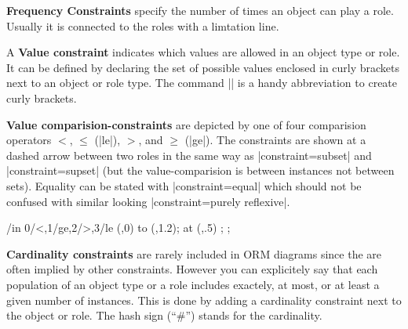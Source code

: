 \documentclass[a4paper,10pt]{article}
\begin{document}
\noindent\textbf{Frequency Constraints} specify the number of times an object can play a role. Usually it is connected to the roles with a limtation line. %

\begin{codeexample}[width=3cm]
\end{codeexample}

\noindent A \textbf{Value constraint} indicates which values are allowed in an object type or role. It can be defined by declaring the set of possible values enclosed in curly brackets next to an object or role type. The command |\ormbraces| is a handy abbreviation to create curly brackets.

\begin{codeexample}[]
\end{codeexample}

\noindent\textbf{Value comparision-constraints} are depicted by one of four comparision operators $<$, $\le$ (|le|), $>$, and $\ge$ (|ge|). The constraints are shown at a dashed arrow between two roles in the same way as |constraint=subset| and |constraint=supset| (but the value-comparision is between instances not between sets). Equality can be stated with |constraint=equal| which should not be confused with similar looking |constraint=purely reflexive|.

\begin{codeexample}[]
\tikz \foreach \x/\s in {0/<,1/ge,2/>,3/le}{
  \draw[limits to] (\x,0) to (\x,1.2);
  \node[constraint=\s] at (\x,.5) {};
};
\end{codeexample}

\noindent\textbf{Cardinality constraints} are rarely included in ORM diagrams since the are often implied by other constraints. However you can explicitely say that each population of an object type or a role includes exactely, at most, or at least a given number of instances. This is done by adding a cardinality constraint next to the object or role. The hash sign (``\#'') stands for the cardinality. 
\end{document}
